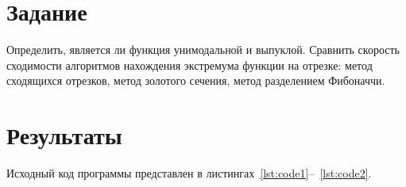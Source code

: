 \documentclass[a4paper, 14pt]{extarticle}
\begin{document}
\renewcommand{\ttdefault}{pcr}

\setlength{\tabcolsep}{3pt}
\newpage
\setcounter{page}{2}

\section{Задание}\label{Sect::task}

Определить, является ли функция унимодальной и выпуклой.
Сравнить скорость сходимости алгоритмов нахождения экстремума функции на отрезке: метод сходящихся отрезков, метод золотого сечения, метод разделением Фибоначчи.

\section{Результаты}\label{Sect::res}

Исходный код программы представлен в листингах~\ref{lst:code1}--~\ref{lst:code2}.
\end{document}
